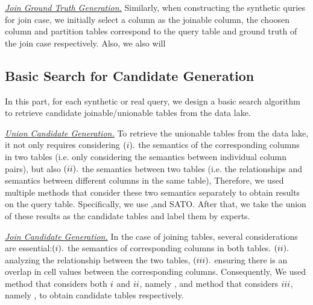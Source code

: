 \noindent \underline{\textit{Join Ground Truth Generation.}} 
Similarly, when constructing the synthetic quries for join case, we initially select a column as the joinable column, the choosen column and partition tables correspond to the query table and ground truth of the join case respectively. Also, we also will 


 



\subsection{Basic Search for Candidate Generation}
In this part, for each synthetic or real query, we design a basic search algorithm to retrieve  candidate joinable/unionable tables from the data lake. 

\noindent \underline{\textit{Union Candidate Generation.}}  
To retrieve the unionable tables from the data lake, it not only requires considering $(\romannumeral1 ).$  the semantics of the corresponding columns in two tables (i.e. only considering the semantics between individual column pairs), but also $(\romannumeral2 ).$ the semantics between two tables (i.e. the relationships and semantics between different columns in the same table),  Therefore, we used multiple methods that consider these two semantics separately to obtain results on the query table. Specifically, we use \starmie,\santos and SATO. After that, we take the union of these results as the candidate tables and label them by experts.

\noindent \underline{\textit{Join Candidate Generation.}}  
In the case of joining tables, several considerations are essential:$(\romannumeral1).$ the semantics of corresponding columns in both tables. $(\romannumeral2).$ analyzing the relationship between the two tables, $(\romannumeral3).$ ensuring there is an overlap in cell values between the corresponding columns. Consequently, We used method that considers both $\romannumeral1$ and $\romannumeral2$, namely \deepjoin, and method that considers $\romannumeral3$, namely \josie, to obtain candidate tables respectively.

